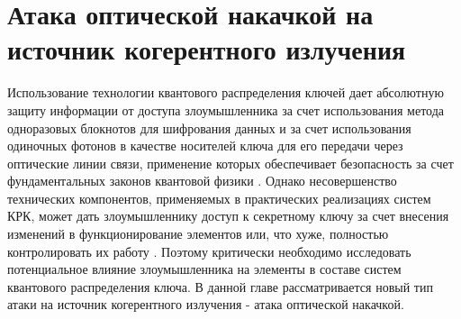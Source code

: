 \chapter{Атака оптической накачкой на источник когерентного излучения}\label{ch:ch4}
\renewcommand{\thefigure}{4.\arabic{figure}} %
\setcounter{figure}{0}                     %


Использование технологии квантового распределения ключей дает абсолютную защиту информации от доступа злоумышленника за счет использования метода одноразовых блокнотов для шифрования данных и за счет использования одиночных фотонов в качестве носителей ключа для его передачи через оптические линии связи, применение которых обеспечивает безопасность за счет фундаментальных законов квантовой физики \cite{bennett1984,horodecki2008}. Однако несовершенство технических компонентов, применяемых в практических реализациях систем КРК, может дать злоумышленнику доступ к секретному ключу за счет внесения изменений в функционирование элементов или, что хуже, полностью контролировать их работу \cite{lo2014,dixon2017,xu2020,makarov2023}. Поэтому критически необходимо исследовать потенциальное влияние злоумышленника на элементы в составе систем квантового распределения ключа. В данной главе рассматривается новый тип атаки на источник когерентного излучения - атака оптической накачкой.

